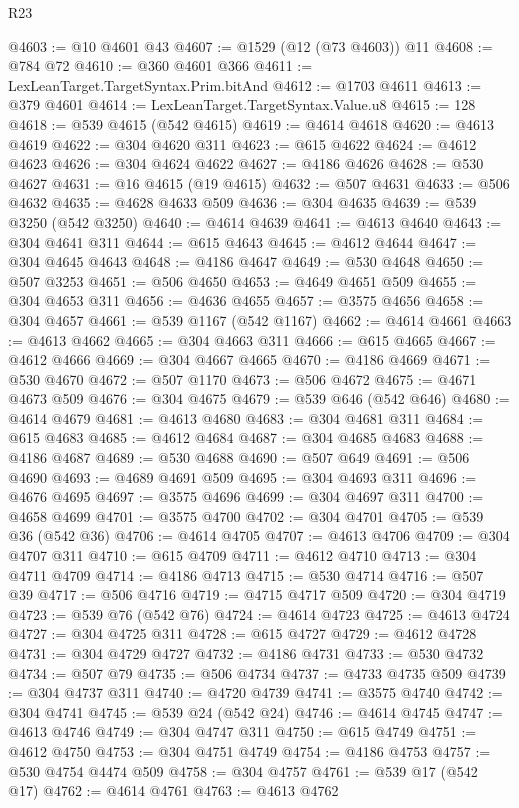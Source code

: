 \begin{lexlean}{R23}
\begin{coremodule}
@4603 := @10 @4601 @43
@4607 := @1529 (@12 (@73 @4603)) @11
@4608 := @784 @72
@4610 := @360 @4601 @366
@4611 := LexLeanTarget.TargetSyntax.Prim.bitAnd
@4612 := @1703 @4611
@4613 := @379 @4601
@4614 := LexLeanTarget.TargetSyntax.Value.u8
@4615 := 128
@4618 := @539 @4615 (@542 @4615)
@4619 := @4614 @4618
@4620 := @4613 @4619
@4622 := @304 @4620 @311
@4623 := @615 @4622
@4624 := @4612 @4623
@4626 := @304 @4624 @4622
@4627 := @4186 @4626
@4628 := @530 @4627
@4631 := @16 @4615 (@19 @4615)
@4632 := @507 @4631
@4633 := @506 @4632
@4635 := @4628 @4633 @509
@4636 := @304 @4635
@4639 := @539 @3250 (@542 @3250)
@4640 := @4614 @4639
@4641 := @4613 @4640
@4643 := @304 @4641 @311
@4644 := @615 @4643
@4645 := @4612 @4644
@4647 := @304 @4645 @4643
@4648 := @4186 @4647
@4649 := @530 @4648
@4650 := @507 @3253
@4651 := @506 @4650
@4653 := @4649 @4651 @509
@4655 := @304 @4653 @311
@4656 := @4636 @4655
@4657 := @3575 @4656
@4658 := @304 @4657
@4661 := @539 @1167 (@542 @1167)
@4662 := @4614 @4661
@4663 := @4613 @4662
@4665 := @304 @4663 @311
@4666 := @615 @4665
@4667 := @4612 @4666
@4669 := @304 @4667 @4665
@4670 := @4186 @4669
@4671 := @530 @4670
@4672 := @507 @1170
@4673 := @506 @4672
@4675 := @4671 @4673 @509
@4676 := @304 @4675
@4679 := @539 @646 (@542 @646)
@4680 := @4614 @4679
@4681 := @4613 @4680
@4683 := @304 @4681 @311
@4684 := @615 @4683
@4685 := @4612 @4684
@4687 := @304 @4685 @4683
@4688 := @4186 @4687
@4689 := @530 @4688
@4690 := @507 @649
@4691 := @506 @4690
@4693 := @4689 @4691 @509
@4695 := @304 @4693 @311
@4696 := @4676 @4695
@4697 := @3575 @4696
@4699 := @304 @4697 @311
@4700 := @4658 @4699
@4701 := @3575 @4700
@4702 := @304 @4701
@4705 := @539 @36 (@542 @36)
@4706 := @4614 @4705
@4707 := @4613 @4706
@4709 := @304 @4707 @311
@4710 := @615 @4709
@4711 := @4612 @4710
@4713 := @304 @4711 @4709
@4714 := @4186 @4713
@4715 := @530 @4714
@4716 := @507 @39
@4717 := @506 @4716
@4719 := @4715 @4717 @509
@4720 := @304 @4719
@4723 := @539 @76 (@542 @76)
@4724 := @4614 @4723
@4725 := @4613 @4724
@4727 := @304 @4725 @311
@4728 := @615 @4727
@4729 := @4612 @4728
@4731 := @304 @4729 @4727
@4732 := @4186 @4731
@4733 := @530 @4732
@4734 := @507 @79
@4735 := @506 @4734
@4737 := @4733 @4735 @509
@4739 := @304 @4737 @311
@4740 := @4720 @4739
@4741 := @3575 @4740
@4742 := @304 @4741
@4745 := @539 @24 (@542 @24)
@4746 := @4614 @4745
@4747 := @4613 @4746
@4749 := @304 @4747 @311
@4750 := @615 @4749
@4751 := @4612 @4750
@4753 := @304 @4751 @4749
@4754 := @4186 @4753
@4757 := @530 @4754 @4474 @509
@4758 := @304 @4757
@4761 := @539 @17 (@542 @17)
@4762 := @4614 @4761
@4763 := @4613 @4762

\end{coremodule}
\end{lexlean}
